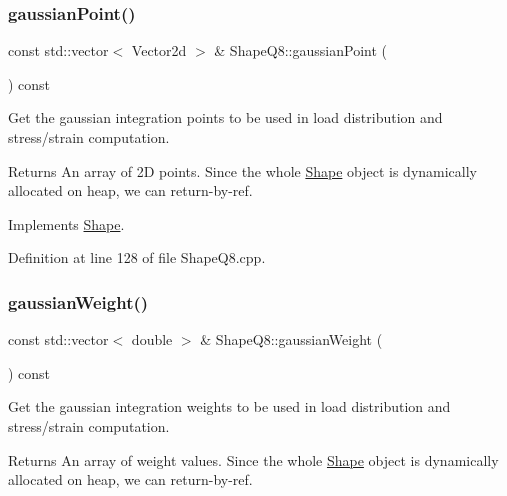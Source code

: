 \subsubsection{\texorpdfstring{gaussian\+Point()}{gaussianPoint()}}
{\footnotesize\ttfamily const std\+::vector$<$ Vector2d $>$ \& Shape\+Q8\+::gaussian\+Point (\begin{DoxyParamCaption}{ }\end{DoxyParamCaption}) const\hspace{0.3cm}{\ttfamily [virtual]}}



Get the gaussian integration points to be used in load distribution and stress/strain computation. 

\begin{DoxyReturn}{Returns}
An array of 2D points. Since the whole \mbox{\hyperlink{class_shape}{Shape}} object is dynamically allocated on heap, we can return-\/by-\/ref. 
\end{DoxyReturn}


Implements \mbox{\hyperlink{class_shape_afa8029d0991fc5d9054a667823224bd0}{Shape}}.



Definition at line 128 of file Shape\+Q8.\+cpp.

\mbox{\label{class_shape_q8_a30891417d7ba6d6457b8b5567add07f5}} 
\subsubsection{\texorpdfstring{gaussian\+Weight()}{gaussianWeight()}}
{\footnotesize\ttfamily const std\+::vector$<$ double $>$ \& Shape\+Q8\+::gaussian\+Weight (\begin{DoxyParamCaption}{ }\end{DoxyParamCaption}) const\hspace{0.3cm}{\ttfamily [virtual]}}



Get the gaussian integration weights to be used in load distribution and stress/strain computation. 

\begin{DoxyReturn}{Returns}
An array of weight values. Since the whole \mbox{\hyperlink{class_shape}{Shape}} object is dynamically allocated on heap, we can return-\/by-\/ref. 
\end{DoxyReturn}


